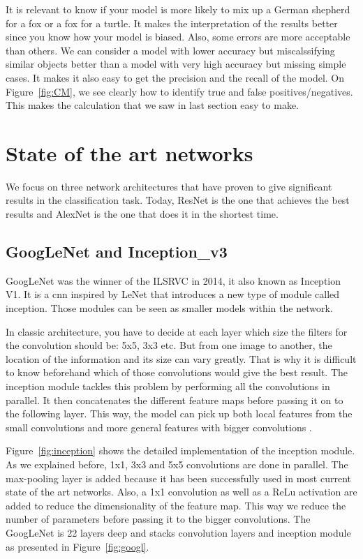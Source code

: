 It is relevant to know if your model is more likely to mix up  a German shepherd for a fox or a fox for a turtle. It makes the interpretation of the results better since you know how your model is biased. Also, some errors are more acceptable than others. We can consider a model with lower accuracy but miscalssifying similar objects better than a model with very high accuracy but missing simple cases. 
It makes it also easy to get the precision and the recall of the model. On Figure~\ref{fig:CM}, we see clearly how to identify true and false positives/negatives. This makes the calculation that we saw in last section easy to make. 

\section{State of the art networks}
We focus on three network architectures that have proven to give significant results in the classification task. Today, ResNet is the one that achieves the best results and AlexNet is the one that does it in the shortest time.    

\subsection{GoogLeNet and Inception\_v3}
GoogLeNet was the winner of the ILSRVC in 2014, it also known as Inception V1. It is a \gls{cnn} inspired by LeNet that introduces a new type of module called inception. Those modules can be seen as smaller models within the network. 

In classic architecture, you have to decide at each layer which size the filters for the convolution should be: 5x5, 3x3 etc. But from one image to another, the location of the information and its size can vary greatly. That is why it is difficult to know beforehand which of those convolutions would give the best result. The inception module tackles this problem by performing all the convolutions in parallel. It then concatenates the different feature maps before passing it on to the following layer. This way, the model can pick up both local features from the small convolutions and more general features with bigger convolutions \cite{googlepaper}. 

Figure~\ref{fig:inception} shows the detailed implementation of the inception module. As we explained before, 1x1, 3x3 and 5x5 convolutions are done in parallel. The max-pooling layer is added because it has been successfully used in most current state of the art networks. Also, a 1x1 convolution as well as a ReLu activation are added to reduce the dimensionality of the feature map. This way we reduce the number of parameters before passing it to the bigger convolutions. The GoogLeNet is 22 layers deep and stacks convolution layers and inception module as presented in Figure~\ref{fig:googl}.

